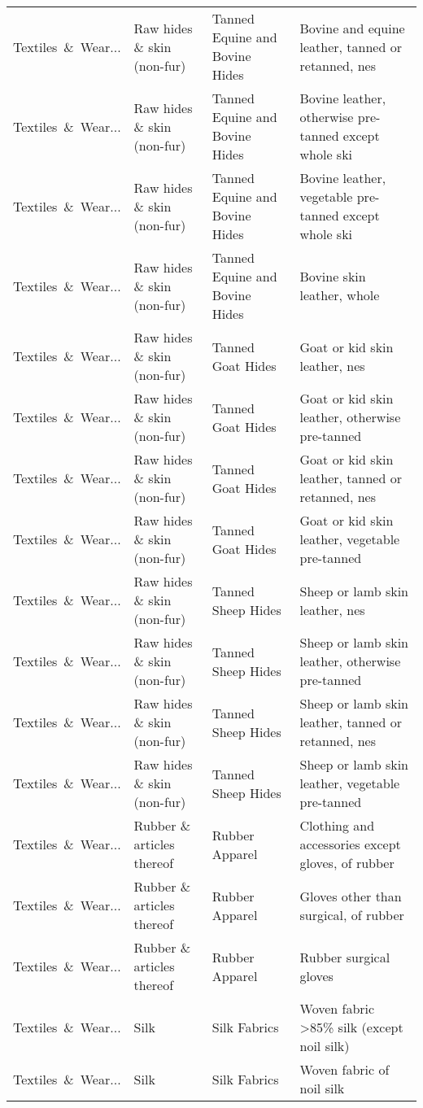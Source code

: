 \begin{appendices}
\begin{xltabular}{\textwidth}{|p{0.10\textwidth}|p{0.25\textwidth}|p{0.24\textwidth}|p{0.31\textwidth}|}
Textiles\ \&\ Wear... & Raw hides \& skin (non-fur) & Tanned Equine and Bovine Hides & Bovine and equine leather, tanned or retanned, nes \\
Textiles\ \&\ Wear... & Raw hides \& skin (non-fur) & Tanned Equine and Bovine Hides & Bovine leather, otherwise pre-tanned except whole ski \\
Textiles\ \&\ Wear... & Raw hides \& skin (non-fur) & Tanned Equine and Bovine Hides & Bovine leather, vegetable pre-tanned except whole ski \\
Textiles\ \&\ Wear... & Raw hides \& skin (non-fur) & Tanned Equine and Bovine Hides & Bovine skin leather, whole \\
Textiles\ \&\ Wear... & Raw hides \& skin (non-fur) & Tanned Goat Hides & Goat or kid skin leather, nes \\
Textiles\ \&\ Wear... & Raw hides \& skin (non-fur) & Tanned Goat Hides & Goat or kid skin leather, otherwise pre-tanned \\
Textiles\ \&\ Wear... & Raw hides \& skin (non-fur) & Tanned Goat Hides & Goat or kid skin leather, tanned or retanned, nes \\
Textiles\ \&\ Wear... & Raw hides \& skin (non-fur) & Tanned Goat Hides & Goat or kid skin leather, vegetable pre-tanned \\
Textiles\ \&\ Wear... & Raw hides \& skin (non-fur) & Tanned Sheep Hides & Sheep or lamb skin leather, nes \\
Textiles\ \&\ Wear... & Raw hides \& skin (non-fur) & Tanned Sheep Hides & Sheep or lamb skin leather, otherwise pre-tanned \\
Textiles\ \&\ Wear... & Raw hides \& skin (non-fur) & Tanned Sheep Hides & Sheep or lamb skin leather, tanned or retanned, nes \\
Textiles\ \&\ Wear... & Raw hides \& skin (non-fur) & Tanned Sheep Hides & Sheep or lamb skin leather, vegetable pre-tanned \\
Textiles\ \&\ Wear... & Rubber \& articles thereof & Rubber Apparel & Clothing and accessories except gloves, of rubber \\
Textiles\ \&\ Wear... & Rubber \& articles thereof & Rubber Apparel & Gloves other than surgical, of rubber \\
Textiles\ \&\ Wear... & Rubber \& articles thereof & Rubber Apparel & Rubber surgical gloves \\
Textiles\ \&\ Wear... & Silk & Silk Fabrics & Woven fabric >85\% silk (except noil silk) \\
Textiles\ \&\ Wear... & Silk & Silk Fabrics & Woven fabric of noil silk \\

\end{xltabular}
\end{appendices}
